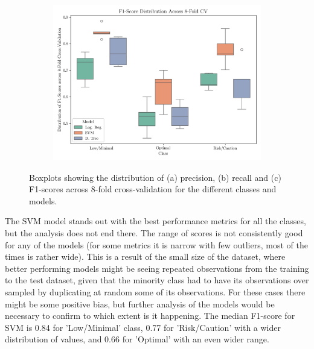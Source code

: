 \documentclass[conference]{IEEEtran}
\begin{document}
\begin{figure}[H]
    \ContinuedFloat
    \vspace{0.05cm}

    \begin{subfigure}[1]{\linewidth}
        \centering
        \includegraphics[width=0.95\linewidth]{assets/box_f1score.png}
        \caption{ }
        \label{box_f1score}
    \end{subfigure}
    
    \caption{Boxplots showing the distribution of (a) precision, (b) recall and (c) F1-scores across 8-fold cross-validation for the different classes and models.}
    \label{box_plots1}
\end{figure} %

The SVM model stands out with the best performance metrics for all the classes, but the analysis does not end there. The range of scores is not consistently good for any of the models (for some metrics it is narrow with few outliers, most of the times is rather wide). This is a result of the small size of the dataset, where better performing models might be seeing repeated observations from the training to the test dataset, given that the minority class had to have its observations over sampled by duplicating at random some of its observations. For these cases there might be some positive bias, but further analysis of the models would be necessary to confirm to which extent is it happening. The median F1-score for SVM is 0.84 for 'Low/Minimal' class, 0.77 for 'Risk/Caution' with a wider distribution of values, and 0.66 for 'Optimal' with an even wider range. 
\end{document}
